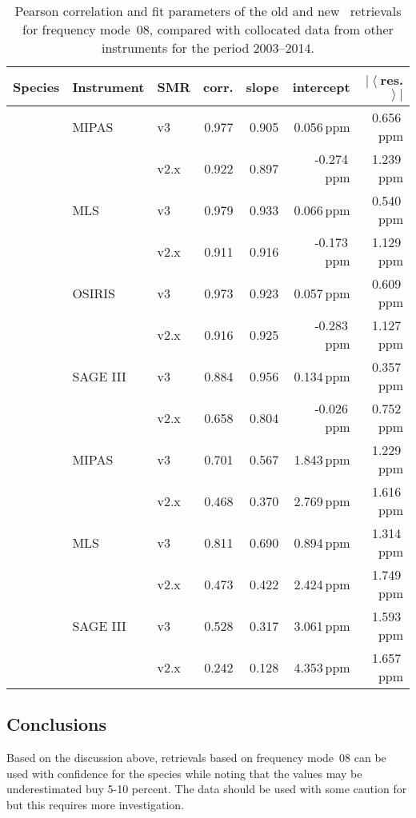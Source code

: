 \begin{table}[hbt]
\centering
\caption{Pearson correlation and fit parameters of the old and new \smr\
retrievals for frequency mode~08, compared with collocated data from other
instruments for the period 2003--2014.
}
\label{tab:fm08:stats}
\begin{tabular}{lllrrrr}
    \toprule
    \textbf{Species} & \textbf{Instrument} & \textbf{SMR} & \textbf{corr.} & \textbf{slope} & \textbf{intercept} & \textbf{$\left|\left<\right.\right.$res.$\left.\left.\right>\right|$} \\
    \midrule
    \chem{O3}   & MIPAS     & v3    & 0.977 & 0.905 & 0.056\,ppm    & 0.656\,ppm \\
                &           & v2.x  & 0.922 & 0.897 & -0.274\,ppm   & 1.239\,ppm \\
    \cline{2-7}
                & MLS       & v3    & 0.979 & 0.933 & 0.066\,ppm    & 0.540\,ppm \\
                &           & v2.x  & 0.911 & 0.916 & -0.173\,ppm   & 1.129\,ppm \\
    \cline{2-7}
                & OSIRIS    & v3    & 0.973 & 0.923 & 0.057\,ppm    & 0.609\,ppm \\
                &           & v2.x  & 0.916 & 0.925 & -0.283\,ppm   & 1.127\,ppm \\
    \cline{2-7}
                & SAGE III  & v3    & 0.884 & 0.956 & 0.134\,ppm    & 0.357\,ppm \\
                &           & v2.x  & 0.658 & 0.804 & -0.026\,ppm   & 0.752\,ppm \\
    \midrule
    \chem{H_2O} & MIPAS     & v3    & 0.701 & 0.567 & 1.843\,ppm    & 1.229\,ppm \\
                &           & v2.x  & 0.468 & 0.370 & 2.769\,ppm    & 1.616\,ppm \\
    \cline{2-7}
                & MLS       & v3    & 0.811 & 0.690 & 0.894\,ppm    & 1.314\,ppm \\
                &           & v2.x  & 0.473 & 0.422 & 2.424\,ppm    & 1.749\,ppm \\
    \cline{2-7}
                & SAGE III  & v3    & 0.528 & 0.317 & 3.061\,ppm    & 1.593\,ppm \\
                &           & v2.x  & 0.242 & 0.128 & 4.353\,ppm    & 1.657\,ppm \\
    \bottomrule
\end{tabular}
\end{table}

\subsection{Conclusions}
\label{sec:fm08:conclusions}
Based on the discussion above, retrievals based on frequency mode~08 can be
used with confidence for the species \chem{O_3} while noting that the values may be underestimated buy 5-10 percent.
The data  should be used with some
caution for  but this requires more investigation.
